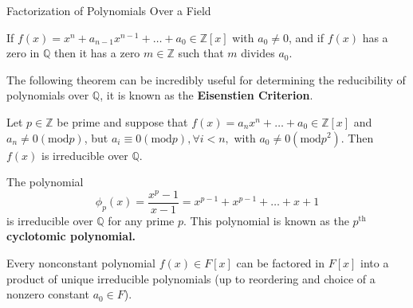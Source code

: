 \begin{section}{Factorization of Polynomials Over a Field}
\begin{cor}
If $f(x) = x^{n} + a_{n-1}x^{n-1} + \dots + a_{0} \in \mathbb{Z}[x]$ with $a_{0} \neq 0$, and if $f(x)$ has a zero in $\mathbb{Q}$ then it has a zero $m \in \mathbb{Z}$ such that $m$ divides $a_{0}$.
\end{cor}

The following theorem can be incredibly useful for determining the reducibility of polynomials over $\mathbb{Q}$, it is known as the {\bf Eisenstien Criterion}.

\begin{thm}
Let $p \in \mathbb{Z}$ be prime and suppose that $f(x) = a_{n}x^{n} + \dots + a_{0} \in \mathbb{Z}[x]$ and $a_{n} \neq 0(\textrm{mod}p)$, but $a_{i} \equiv 0(\textrm{mod}p), \forall i<n,$ with $a_{0} \neq 0(\textrm{mod}p^{2})$. Then $f(x)$ is irreducible over $\mathbb{Q}$.
\end{thm}

\begin{cor}
The polynomial $$\phi_{p}(x) = \frac{x^{p}-1}{x-1} = x^{p-1} + x^{p-1} + \dots + x + 1$$ is irreducible over $\mathbb{Q}$ for any prime $p$. This polynomial is known as the {\bf $p^{\textrm{th}}$ cyclotomic polynomial.}
\end{cor}

\begin{thm}
Every nonconstant polynomial $f(x) \in F[x]$ can be factored in $F[x]$ into a product of unique irreducible polynomials (up to reordering and choice of a nonzero constant $a_{0} \in F$).
\end{thm}

\end{section}